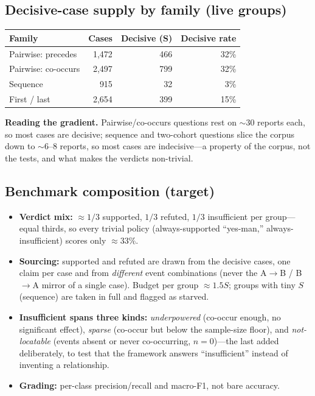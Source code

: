 \documentclass[11pt]{article}
\begin{document}
\subsection*{Decisive-case supply by family (live groups)}
\noindent\begin{tabular}{lrrr}
\toprule
\textbf{Family} & \textbf{Cases} & \textbf{Decisive (S)} & \textbf{Decisive rate} \\ \midrule
Pairwise: precedes & 1,472 & 466 & 32\% \\
Pairwise: co-occurs & 2,497 & 799 & 32\% \\
Sequence & 915 & 32 & 3\% \\
First / last & 2,654 & 399 & 15\% \\
\bottomrule\end{tabular}
\medskip\noindent\textbf{Reading the gradient.} Pairwise/co-occurs questions rest on ${\sim}30$ reports each, so most cases are decisive; sequence and two-cohort questions slice the corpus down to ${\sim}6$--$8$ reports, so most cases are indecisive---a property of the corpus, not the tests, and what makes the verdicts non-trivial.
\subsection*{Benchmark composition (target)}
\begin{itemize}\itemsep2pt
\item \textbf{Verdict mix:} ${\approx}1/3$ supported, $1/3$ refuted, $1/3$ insufficient per group---equal thirds, so every trivial policy (always-supported ``yes-man,'' always-insufficient) scores only ${\approx}33\%$.
\item \textbf{Sourcing:} supported and refuted are drawn from the decisive cases, one claim per case and from \emph{different} event combinations (never the A$\rightarrow$B / B$\rightarrow$A mirror of a single case). Budget per group ${\approx}1.5S$; groups with tiny $S$ (sequence) are taken in full and flagged as starved.
\item \textbf{Insufficient spans three kinds:} \emph{underpowered} (co-occur enough, no significant effect), \emph{sparse} (co-occur but below the sample-size floor), and \emph{not-locatable} (events absent or never co-occurring, $n=0$)---the last added deliberately, to test that the framework answers ``insufficient'' instead of inventing a relationship.
\item \textbf{Grading:} per-class precision/recall and macro-F1, not bare accuracy.
\end{itemize}
\end{document}
